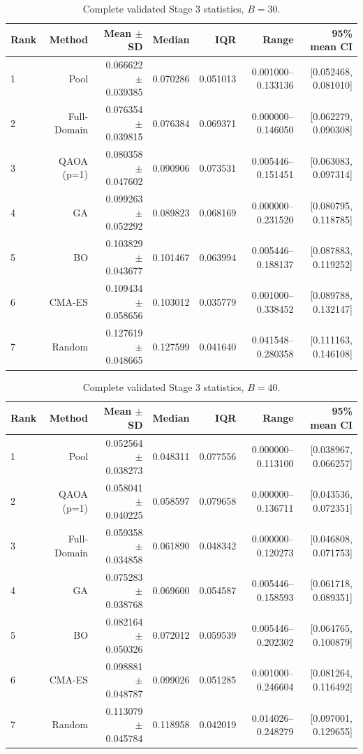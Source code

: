\begin{table}[htbp]\centering
\caption{Complete validated Stage 3 statistics, $B=30$.}\label{tab:complete30}
\scriptsize
\setlength{\tabcolsep}{4pt}
\begin{tabular}{lrrrrrr}\toprule
Rank & Method & Mean $\pm$ SD & Median & IQR & Range & 95\% mean CI \\ \midrule
1 & Pool & 0.066622 $\pm$ 0.039385 & 0.070286 & 0.051013 & 0.001000--0.133136 & [0.052468, 0.081010] \\
2 & Full-Domain & 0.076354 $\pm$ 0.039815 & 0.076384 & 0.069371 & 0.000000--0.146050 & [0.062279, 0.090308] \\
3 & QAOA (p=1) & 0.080358 $\pm$ 0.047602 & 0.090906 & 0.073531 & 0.005446--0.151451 & [0.063083, 0.097314] \\
4 & GA & 0.099263 $\pm$ 0.052292 & 0.089823 & 0.068169 & 0.000000--0.231520 & [0.080795, 0.118785] \\
5 & BO & 0.103829 $\pm$ 0.043677 & 0.101467 & 0.063994 & 0.005446--0.188137 & [0.087883, 0.119252] \\
6 & CMA-ES & 0.109434 $\pm$ 0.058656 & 0.103012 & 0.035779 & 0.001000--0.338452 & [0.089788, 0.132147] \\
7 & Random & 0.127619 $\pm$ 0.048665 & 0.127599 & 0.041640 & 0.041548--0.280358 & [0.111163, 0.146108] \\
\bottomrule\end{tabular}
\end{table}

\begin{table}[htbp]\centering
\caption{Complete validated Stage 3 statistics, $B=40$.}\label{tab:complete40}
\scriptsize
\setlength{\tabcolsep}{4pt}
\begin{tabular}{lrrrrrr}\toprule
Rank & Method & Mean $\pm$ SD & Median & IQR & Range & 95\% mean CI \\ \midrule
1 & Pool & 0.052564 $\pm$ 0.038273 & 0.048311 & 0.077556 & 0.000000--0.113100 & [0.038967, 0.066257] \\
2 & QAOA (p=1) & 0.058041 $\pm$ 0.040225 & 0.058597 & 0.079658 & 0.000000--0.136711 & [0.043536, 0.072351] \\
3 & Full-Domain & 0.059358 $\pm$ 0.034858 & 0.061890 & 0.048342 & 0.000000--0.120273 & [0.046808, 0.071753] \\
4 & GA & 0.075283 $\pm$ 0.038768 & 0.069600 & 0.054587 & 0.005446--0.158593 & [0.061718, 0.089351] \\
5 & BO & 0.082164 $\pm$ 0.050326 & 0.072012 & 0.059539 & 0.005446--0.202302 & [0.064765, 0.100879] \\
6 & CMA-ES & 0.098881 $\pm$ 0.048787 & 0.099026 & 0.051285 & 0.001000--0.246604 & [0.081264, 0.116492] \\
7 & Random & 0.113079 $\pm$ 0.045784 & 0.118958 & 0.042019 & 0.014026--0.248279 & [0.097001, 0.129655] \\
\bottomrule\end{tabular}
\end{table}
